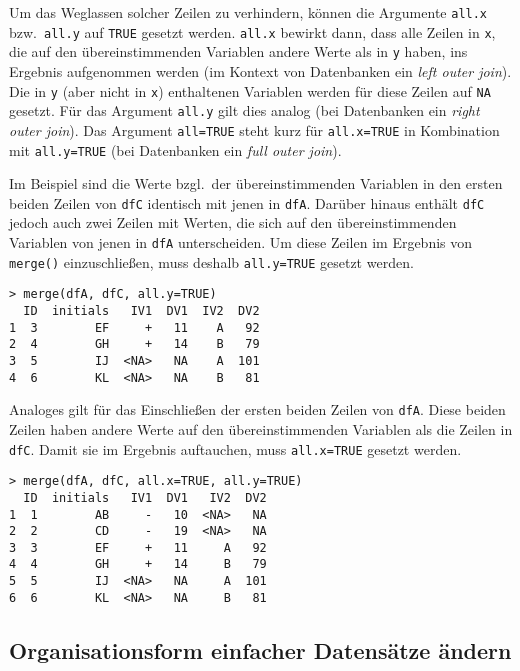 Um das Weglassen solcher Zeilen zu verhindern, können die Argumente \lstinline!all.x! bzw.\ \lstinline!all.y! auf \lstinline!TRUE! gesetzt werden. \lstinline!all.x! bewirkt dann, dass alle Zeilen in \lstinline!x!, die auf den übereinstimmenden Variablen andere Werte als in \lstinline!y! haben, ins Ergebnis aufgenommen werden (im Kontext von Datenbanken ein \emph{left outer join}). Die in \lstinline!y! (aber nicht in \lstinline!x!) enthaltenen Variablen werden für diese Zeilen auf \lstinline!NA! gesetzt. Für das Argument \lstinline!all.y! gilt dies analog (bei Datenbanken ein \emph{right outer join}). Das Argument \lstinline!all=TRUE! steht kurz für \lstinline!all.x=TRUE! in Kombination mit \lstinline!all.y=TRUE! (bei Datenbanken ein \emph{full outer join}).

Im Beispiel sind die Werte bzgl.\ der übereinstimmenden Variablen in den ersten beiden Zeilen von \lstinline!dfC! identisch mit jenen in \lstinline!dfA!\@. Darüber hinaus enthält \lstinline!dfC! jedoch auch zwei Zeilen mit Werten, die sich auf den übereinstimmenden Variablen von jenen in \lstinline!dfA! unterscheiden. Um diese Zeilen im Ergebnis von \lstinline!merge()! einzuschließen, muss deshalb \lstinline!all.y=TRUE! gesetzt werden.
\begin{lstlisting}
> merge(dfA, dfC, all.y=TRUE)
  ID  initials   IV1  DV1  IV2  DV2
1  3        EF     +   11    A   92
2  4        GH     +   14    B   79
3  5        IJ  <NA>   NA    A  101
4  6        KL  <NA>   NA    B   81
\end{lstlisting}

Analoges gilt für das Einschließen der ersten beiden Zeilen von \lstinline!dfA!. Diese beiden Zeilen haben andere Werte auf den übereinstimmenden Variablen als die Zeilen in \lstinline!dfC!\@. Damit sie im Ergebnis auftauchen, muss \lstinline!all.x=TRUE! gesetzt werden.
\begin{lstlisting}
> merge(dfA, dfC, all.x=TRUE, all.y=TRUE)
  ID  initials   IV1  DV1   IV2  DV2
1  1        AB     -   10  <NA>   NA
2  2        CD     -   19  <NA>   NA
3  3        EF     +   11     A   92
4  4        GH     +   14     B   79
5  5        IJ  <NA>   NA     A  101
6  6        KL  <NA>   NA     B   81
\end{lstlisting}

\subsection{Organisationsform einfacher Datensätze ändern}
\label{sec:stack}

